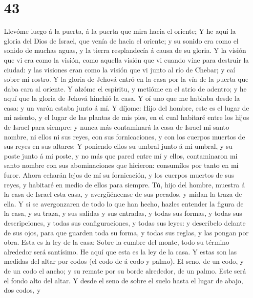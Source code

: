 \hypertarget{section-42}{%
\section{43}\label{section-42}}

 Llevóme luego á la puerta, á la puerta que mira hacia el
oriente;  Y he aquí la gloria del Dios de Israel, que venía
de hacia el oriente; y su sonido era como el sonido de muchas aguas, y
la tierra resplandecía á causa de su gloria.  Y la visión
que vi era como la visión, como aquella visión que vi cuando vine para
destruir la ciudad: y las visiones eran como la visión que vi junto al
río de Chebar; y caí sobre mi rostro.  Y la gloria de Jehová
entró en la casa por la vía de la puerta que daba cara al oriente.
 Y alzóme el espíritu, y metióme en el atrio de adentro; y
he aquí que la gloria de Jehová hinchió la casa.  Y oí uno
que me hablaba desde la casa: y un varón estaba junto á mí. 
Y díjome: Hijo del hombre, este es el lugar de mi asiento, y el lugar de
las plantas de mis pies, en el cual habitaré entre los hijos de Israel
para siempre: y nunca más contaminará la casa de Israel mi santo nombre,
ni ellos ni sus reyes, con sus fornicaciones, y con los cuerpos muertos
de sus reyes en sus altares:  Y poniendo ellos su umbral
junto á mi umbral, y su poste junto á mi poste, y no más que pared entre
mí y ellos, contaminaron mi santo nombre con sus abominaciones que
hicieron: consumílos por tanto en mi furor.  Ahora echarán
lejos de mí su fornicación, y los cuerpos muertos de sus reyes, y
habitaré en medio de ellos para siempre.  Tú, hijo del
hombre, muestra á la casa de Israel esta casa, y avergüéncense de sus
pecados, y midan la traza de ella.  Y si se avergonzaren de
todo lo que han hecho, hazles entender la figura de la casa, y su traza,
y sus salidas y sus entradas, y todas sus formas, y todas sus
descripciones, y todas sus configuraciones, y todas sus leyes: y
descríbelo delante de sus ojos, para que guarden toda su forma, y todas
sus reglas, y las pongan por obra.  Esta es la ley de la
casa: Sobre la cumbre del monte, todo su término alrededor será
santísimo. He aquí que esta es la ley de la casa.  Y estas
son las medidas del altar por codos (el codo de á codo y palmo). El
seno, de un codo, y de un codo el ancho; y su remate por su borde
alrededor, de un palmo. Este será el fondo alto del altar. 
Y desde el seno de sobre el suelo hasta el lugar de abajo, dos codos, y
